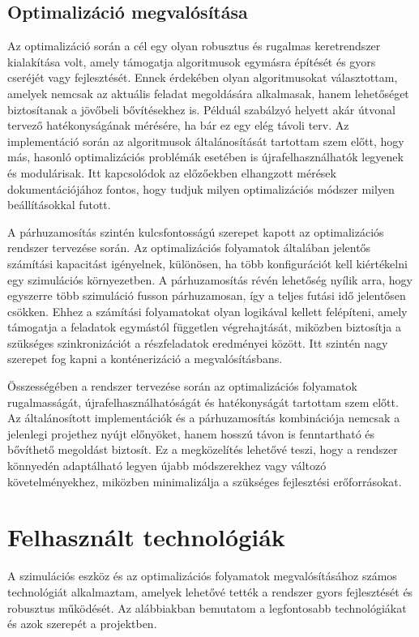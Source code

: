 \subsection{Optimalizáció megvalósítása}
Az optimalizáció során a cél egy olyan robusztus és rugalmas keretrendszer kialakítása volt, amely támogatja algoritmusok egymásra építését és gyors cseréjét vagy fejlesztését. Ennek érdekében olyan algoritmusokat választottam, amelyek nemcsak az aktuális feladat megoldására alkalmasak, hanem lehetőséget biztosítanak a jövőbeli bővítésekhez is. Példuál szabálzyó helyett akár útvonal tervező hatékonyságának mérésére, ha bár ez egy elég távoli terv. Az implementáció során az algoritmusok általánosítását tartottam szem előtt, hogy más, hasonló optimalizációs problémák esetében is újrafelhasználhatók legyenek és modulárisak. Itt kapcsolódok az előzőekben elhangzott mérések dokumentációjához fontos, hogy tudjuk milyen optimalizációs módszer milyen beállításokkal futott.

A párhuzamosítás szintén kulcsfontosságú szerepet kapott az optimalizációs rendszer tervezése során. Az optimalizációs folyamatok általában jelentős számítási kapacitást igényelnek, különösen, ha több konfigurációt kell kiértékelni egy szimulációs környezetben. A párhuzamosítás révén lehetőség nyílik arra, hogy egyszerre több szimuláció fusson párhuzamosan, így a teljes futási idő jelentősen csökken. Ehhez a számítási folyamatokat olyan logikával kellett felépíteni, amely támogatja a feladatok egymástól független végrehajtását, miközben biztosítja a szükséges szinkronizációt a részfeladatok eredményei között. Itt szintén nagy szerepet fog kapni a konténerizáció a megvalósításbans.

Összességében a rendszer tervezése során az optimalizációs folyamatok rugalmasságát, újrafelhasználhatóságát és hatékonyságát tartottam szem előtt. Az általánosított implementációk és a párhuzamosítás kombinációja nemcsak a jelenlegi projethez nyújt előnyöket, hanem hosszú távon is fenntartható és bővíthető megoldást biztosít. Ez a megközelítés lehetővé teszi, hogy a rendszer könnyedén adaptálható legyen újabb módszerekhez vagy változó követelményekhez, miközben minimalizálja a szükséges fejlesztési erőforrásokat.

\section{Felhasznált technológiák}
A szimulációs eszköz és az optimalizációs folyamatok megvalósításához számos technológiát alkalmaztam, amelyek lehetővé tették a rendszer gyors fejlesztését és robusztus működését. Az alábbiakban bemutatom a legfontosabb technológiákat és azok szerepét a projektben.

